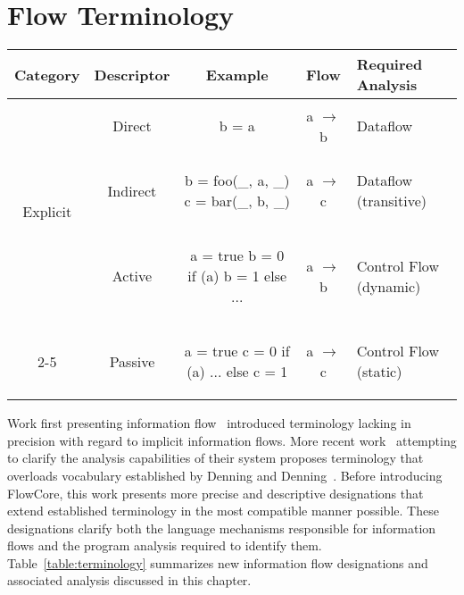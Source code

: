 \chapter{Flow Terminology}

\label{sec:terminology}

\begin{table*}
\centering
\begin{tabular}{ccccm{2.5cm}}
\toprule
Category & Descriptor & Example & Flow & Required Analysis \\
\midrule[\heavyrulewidth]
\multirow{3}{*}{Explicit} & Direct &
\begin{js-embed}
b = a
\end{js-embed} & a $\rightarrow$ b & Dataflow\\
\cmidrule(r){2-5} & Indirect &
\begin{js-embed}
b = foo(_, a, _)
c = bar(_, b, _) 
\end{js-embed}
& a $\rightarrow$ c & Dataflow (transitive) \\
\hline
\multirow{7}{*}{Implicit} & Active &
\begin{js-embed}
a = true
b = 0
if (a)
   b = 1
else
   ...
\end{js-embed}
& a $\rightarrow$ b & Control Flow (dynamic)\\
\cmidrule(r){2-5} & Passive &
\begin{js-embed}
a = true
c = 0
if (a)
   ...
else
   c = 1
\end{js-embed}
& a $\rightarrow$ c & Control Flow (static)\\
\bottomrule
\end{tabular}
\caption{Terminology of Information Flows.}
\label{table:terminology}
\end{table*}

Work first presenting information flow~\cite{denning-cert} introduced terminology lacking in precision with regard to implicit information flows.
More recent work~\cite{empirical-study} attempting to clarify the analysis capabilities of their system proposes terminology that overloads vocabulary established by Denning and Denning~\cite{denning-cert}.
Before introducing FlowCore, this work presents more precise and descriptive designations that extend established terminology in the most compatible manner possible.
These designations clarify both the language mechanisms responsible for information flows and the program analysis required to identify them.
Table~\ref{table:terminology} summarizes new information flow designations and associated analysis discussed in this chapter.

